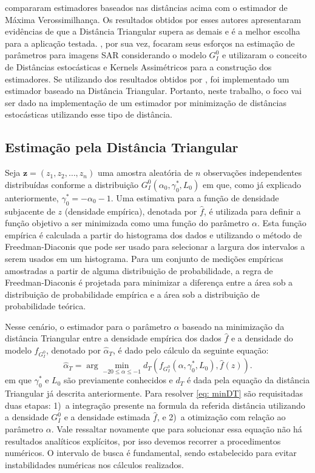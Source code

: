 \citet{Cassetti2013} compararam estimadores baseados nas distâncias acima com o estimador de Máxima Verossimilhança. Os resultados obtidos por esses autores apresentaram evidências de que a Distância Triangular supera as demais e é a melhor escolha para a aplicação testada. 
\citet{FreryStochasticDistances2015}, por sua vez, focaram seus esforços na estimação de parâmetros para imagens SAR considerando o modelo $G_I^0$ e utilizaram o conceito de Distâncias estocásticas e Kernels Assimétricos para a construção dos estimadores. 
Se utilizando dos resultados obtidos por \citet{Cassetti2013}, foi implementado um estimador baseado na Distância Triangular. 
Portanto, neste trabalho, o foco vai ser dado na implementação de um estimador por minimização de distâncias estocásticas utilizando esse tipo de distância.

\subsection{Estimação pela Distância Triangular}

Seja $\bm z = (z_1, z_2, \dots, z_n)$ uma amostra aleatória de $n$ observações independentes distribuídas conforme a distribuição $G_I^0(\alpha_0, \gamma_0^{*}, L_0)$ em que, como já explicado anteriormente, $\gamma_0^{*} = - \alpha_0 - 1$. Uma estimativa para a função de densidade subjacente de $z$ (densidade empírica), denotada por $\widehat{f}$, é utilizada para definir a função objetivo a ser minimizada como uma função do parâmetro $\alpha$. Esta função empírica é calculada a partir do histograma dos dados e utilizando o método de Freedman-Diaconis que pode ser usado para selecionar a largura dos intervalos a serem usados em um histograma. Para um conjunto de medições empíricas amostradas a partir de alguma distribuição de probabilidade, a regra de Freedman-Diaconis \citep{FreedmanDiaconis} é projetada para minimizar a diferença entre a área sob a distribuição de probabilidade empírica e a área sob a distribuição de probabilidade teórica. 

Nesse cenário, o estimador para o parâmetro $\alpha$ baseado na minimização da distância Triangular entre a densidade empírica dos dados $\widehat{f}$ e a densidade do modelo $f_{G_I^0}$, denotado por $\widehat{\alpha}_{T}$, é dado pelo cálculo da seguinte equação:
\begin{equation}
    \widehat{\alpha}_{T} = \arg\min_{-20 \leq \alpha \leq -1} d_T(f_{G_I^0}(\alpha, \gamma_0^{*}, L_0), \widehat{f}(z)) .
    \label{eq: minDT}
\end{equation}
em que $\gamma_0^{*}$ e $L_0$ são previamente conhecidos e $d_T$ é dada pela equação da distância Triangular já descrita anteriormente. 
Para resolver \eqref{eq: minDT} são requisitadas duas etapas: 
1)~a integração presente na formula da referida distância utilizando a densidade $G_I^0$ e a densidade estimada $\widehat{f}$, e 
2)~a otimização com relação ao parâmetro $\alpha$. 
Vale ressaltar novamente que para solucionar essa equação não há resultados analíticos explícitos, por isso devemos recorrer a procedimentos numéricos. 
O intervalo de busca é fundamental, sendo estabelecido para evitar instabilidades numéricas nos cálculos realizados.